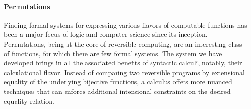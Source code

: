 \paragraph{Permutations} Finding formal systems for expressing various flavors of computable functions has been a major
focus of logic and computer science since its inception. Permutations, being at the core of reversible computing, are an
interesting class of functions, for which there are few formal systems. The system we have developed brings in all the
associated benefits of syntactic calculi, notably, their calculational flavor. Instead of comparing two reversible
programs by extensional equality of the underlying bijective functions, a calculus offers more nuanced techniques that
can enforce additional intensional constraints on the desired equality relation.






